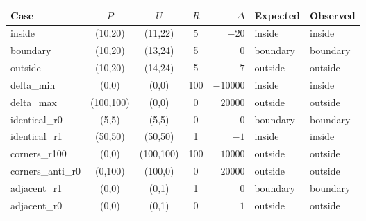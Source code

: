 \begin{tabular}{lcccrll}
\hline
Case & $P$ & $U$ & $R$ & $\Delta$ & Expected & Observed \\
\hline
inside & (10,20) & (11,22) & 5 & $-20$ & inside & inside \\
boundary & (10,20) & (13,24) & 5 & $0$ & boundary & boundary \\
outside & (10,20) & (14,24) & 5 & $7$ & outside & outside \\
delta\_min & (0,0) & (0,0) & 100 & $-10000$ & inside & inside \\
delta\_max & (100,100) & (0,0) & 0 & $20000$ & outside & outside \\
identical\_r0 & (5,5) & (5,5) & 0 & $0$ & boundary & boundary \\
identical\_r1 & (50,50) & (50,50) & 1 & $-1$ & inside & inside \\
corners\_r100 & (0,0) & (100,100) & 100 & $10000$ & outside & outside \\
corners\_anti\_r0 & (0,100) & (100,0) & 0 & $20000$ & outside & outside \\
adjacent\_r1 & (0,0) & (0,1) & 1 & $0$ & boundary & boundary \\
adjacent\_r0 & (0,0) & (0,1) & 0 & $1$ & outside & outside \\
\hline
\end{tabular}
